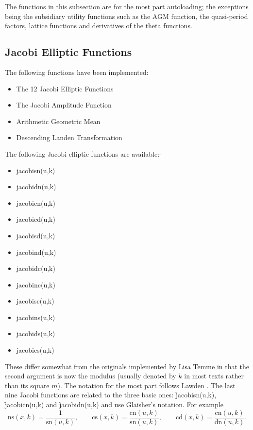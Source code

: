 The functions in this subsection are for the most part autoloading;
the exceptions being the subsidiary utility functions such as the AGM function,
the quasi-period factors, lattice functions and derivatives of the theta functions.

\hypertarget{JACEF}{}
\subsection{Jacobi Elliptic  Functions}
The following functions have been implemented:
\begin{itemize}
\item The 12 Jacobi Elliptic Functions
\item The Jacobi Amplitude Function
\item Arithmetic Geometric Mean
\item Descending Landen Transformation
\end{itemize}

The following Jacobi elliptic functions are available:-
\hypertarget{operator:JACOBISN}{}
\hypertarget{operator:JACOBICN}{}
\hypertarget{operator:JACOBIDN}{}
\hypertarget{operator:Jacobisd}{}
\hypertarget{operator:Jacobind}{}
\hypertarget{operator:Jacobidc}{}
\hypertarget{operator:Jacobinc}{}
\hypertarget{operator:Jacobisc}{}
\hypertarget{operator:Jacobins}{}
\hypertarget{operator:Jacobids}{}
\hypertarget{operator:Jacobics}{}
\begin{itemize}
\item jacobisn(u,k)
\item jacobidn(u,k)
\item jacobicn(u,k)
\item jacobicd(u,k)
\item jacobisd(u,k)
\item jacobind(u,k)
\item jacobidc(u,k)
\item jacobinc(u,k)
\item jacobisc(u,k)
\item jacobins(u,k)
\item jacobids(u,k)
\item jacobics(u,k)
\end{itemize}

These differ somewhat from the originals implemented by Lisa Temme in that
the second argument is now the modulus (usually denoted by $k$ in most texts
rather than its square $m$).  The notation for the most part follows  Lawden
\cite{Lawden:89}. The last nine Jacobi functions are related to the three
basic ones: \f{jacobisn(u,k)}, \f{jacobicn(u,k)} and \f{jacobidn(u,k)} and
use Glaisher's notation. For example
\[ \mathrm{ns}(x,k) = \frac{1}{\mathrm{sn}(u,k)}, \qquad
\mathrm{cs}(x,k) = \frac{\mathrm{cn}(u,k)}{\mathrm{sn}(u,k)}, \qquad
\mathrm{cd}(x,k) = \frac{\mathrm{cn}(u,k)}{\mathrm{dn}(u,k)}. \]

